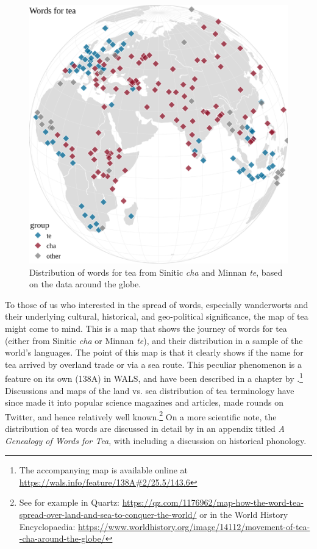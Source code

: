 \begin{figure}[ht!]
    \centering
    \includegraphics[width=\linewidth]{imgs/plots/distribution_tea.pdf}
    \caption{Distribution of words for tea from Sinitic \textit{cha} and Minnan \textit{te}, based on the data around the globe.}
    \label{fig:distribution_tea}
\end{figure}

To those of us who interested in the spread of words, especially \glspl{wanderwort} and their underlying cultural, historical, and geo-political significance, the map of tea might come to mind. This is a map that shows the journey of words for tea (either from Sinitic \textit{cha} or Minnan \textit{te}), and their distribution in a sample of the world's languages. The point of this map is that it clearly shows if the name for tea arrived by overland trade or via a sea route. This peculiar phenomenon is a feature on its own (138A) in \gls{WALS}, and have been described in a chapter by \textcite{dahl_tea_2013}.\footnote{The accompanying map is available online at \url{https://wals.info/feature/138A\#2/25.5/143.6}} Discussions and maps of the land vs. sea distribution of tea terminology have since made it into popular science magazines and articles, made rounds on Twitter, and hence relatively well known.\footnote{See for example \textcite{sonnad_tea_2018} in Quartz: \url{https://qz.com/1176962/map-how-the-word-tea-spread-over-land-and-sea-to-conquer-the-world/} or \textcite{netchev_movement_2022} in the World History Encyclopaedia: \url{https://www.worldhistory.org/image/14112/movement-of-tea--cha-around-the-globe/}} On a more scientific note, the distribution of tea words are discussed in detail by \autocite[261-270]{mair_true_2009} in an appendix titled \textit{A Genealogy of Words for Tea}, with including a discussion on historical phonology.

